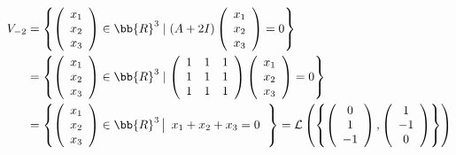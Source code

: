 \begin{ejercicio}
\begin{enumerate}
       \begin{equation*}\begin{split}
           V_{-2} & = \left\{ \left(\begin{array}{c}
                    x_1 \\
                    x_2 \\
                    x_3
               \end{array}\right) \in \bb{R}^3 \mid (A+2I)\left(\begin{array}{c}
                    x_1 \\
                    x_2 \\
                    x_3
               \end{array}\right) = 0 \right\} \\
               & = \left\{ \left(\begin{array}{c}
                    x_1 \\
                    x_2 \\
                    x_3
               \end{array}\right) \in \bb{R}^3 \mid \left( \begin{array}{ccc}
                    1 & 1 & 1 \\
                    1  & 1 & 1 \\
                    1 & 1 & 1
            \end{array}\right) \left(\begin{array}{c}
                    x_1 \\
                    x_2 \\
                    x_3
               \end{array}\right) = 0 \right\} \\
               & = \left\{ \left(\begin{array}{c}
                    x_1 \\
                    x_2  \\
                    x_3
               \end{array}\right) \in \bb{R}^3 \left| \begin{array}{c}
                    x_1 + x_2 + x_3 = 0
               \end{array}\right. \right\} = \mathcal{L}\left(\left\{
                    \left(\begin{array}{c}
                        0 \\
                        1 \\
                        -1 \\
                   \end{array}\right),
                   \left(\begin{array}{c}
                        1 \\
                        -1 \\
                        0 \\
                   \end{array}\right)
                   \right\}\right)
       \end{split}\end{equation*}
       


\end{enumerate}
\end{ejercicio}
